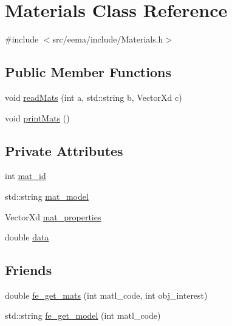 \hypertarget{class_materials}{}\section{Materials Class Reference}
\label{class_materials}


{\ttfamily \#include $<$src/eema/include/\+Materials.\+h$>$}

\subsection*{Public Member Functions}
\begin{DoxyCompactItemize}
\item 
void \hyperlink{class_materials_a06e59a5742730b2292d39b7488523505}{read\+Mats} (int a, std\+::string b, Vector\+Xd c)
\item 
void \hyperlink{class_materials_acce0e8fc2993ca136273747fd75b8fc1}{print\+Mats} ()
\end{DoxyCompactItemize}
\subsection*{Private Attributes}
\begin{DoxyCompactItemize}
\item 
int \hyperlink{class_materials_a9687f294a4ae4b2603eed657ee7dbebf}{mat\+\_\+id}
\item 
std\+::string \hyperlink{class_materials_abe8d649257d71769de7a3aa20ff8977e}{mat\+\_\+model}
\item 
Vector\+Xd \hyperlink{class_materials_af663f6cf518ba3f857bac40a1e33eac0}{mat\+\_\+properties}
\item 
double \hyperlink{class_materials_ae1d76dc4fa0500285c6759f55038e4c6}{data}
\end{DoxyCompactItemize}
\subsection*{Friends}
\begin{DoxyCompactItemize}
\item 
double \hyperlink{class_materials_af7ffbad6dfcc99fc88b130c1a7b1720a}{fe\+\_\+get\+\_\+mats} (int matl\+\_\+code, int obj\+\_\+interest)
\item 
std\+::string \hyperlink{class_materials_a34d6fb85943d945b7e8600d2ef4220d0}{fe\+\_\+get\+\_\+model} (int matl\+\_\+code)
\end{DoxyCompactItemize}


